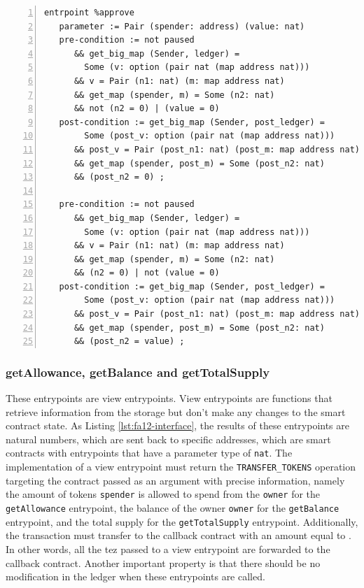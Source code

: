 \documentclass[a4paper,UKenglish,cleveref, autoref, thm-restate]{lipics-v2021}
\begin{document}
\begin{lstlisting}[float,captionpos=b,caption={Specification for the \lstinline/approve/ entrypoint},label={lst:specification-approve},numbers=left]
entrpoint %approve
   parameter := Pair (spender: address) (value: nat)
   pre-condition := not paused 
      && get_big_map (Sender, ledger) = 
        Some (v: option (pair nat (map address nat))) 
      && v = Pair (n1: nat) (m: map address nat) 
      && get_map (spender, m) = Some (n2: nat) 
      && not (n2 = 0) | (value = 0)
   post-condition := get_big_map (Sender, post_ledger) = 
        Some (post_v: option (pair nat (map address nat))) 
      && post_v = Pair (post_n1: nat) (post_m: map address nat) 
      && get_map (spender, post_m) = Some (post_n2: nat) 
      && (post_n2 = 0) ;

   pre-condition := not paused 
      && get_big_map (Sender, ledger) = 
        Some (v: option (pair nat (map address nat))) 
      && v = Pair (n1: nat) (m: map address nat) 
      && get_map (spender, m) = Some (n2: nat) 
      && (n2 = 0) | not (value = 0)
   post-condition := get_big_map (Sender, post_ledger) = 
        Some (post_v: option (pair nat (map address nat))) 
      && post_v = Pair (post_n1: nat) (post_m: map address nat) 
      && get_map (spender, post_m) = Some (post_n2: nat) 
      && (post_n2 = value) ;
\end{lstlisting}

\subsubsection{getAllowance, getBalance and  getTotalSupply}
These entrypoints are view entrypoints. View entrypoints are functions that retrieve information from the storage but don't make any changes to the smart contract state. As Listing \ref{lst:fa12-interface}, the results of these entrypoints are natural numbers, which are sent back to specific addresses, which are smart contracts with entrypoints that have a parameter type of \lstinline/nat/. The implementation of a view entrypoint must return the \lstinline/TRANSFER_TOKENS/ operation targeting the contract passed as an argument with precise information, namely the amount of tokens \lstinline/spender/ is allowed to spend from the \lstinline/owner/ for the \lstinline/getAllowance/ entrypoint, the balance of the owner \lstinline/owner/ for the \lstinline/getBalance/ entrypoint, and the total supply for the \lstinline/getTotalSupply/ entrypoint. Additionally, the transaction must transfer to the callback contract with an amount equal to \AMOUNT. In other words, all the tez passed to a view entrypoint are forwarded to the callback contract. Another important property is that there should be no modification in the ledger when these entrypoints are called.
\end{document}
